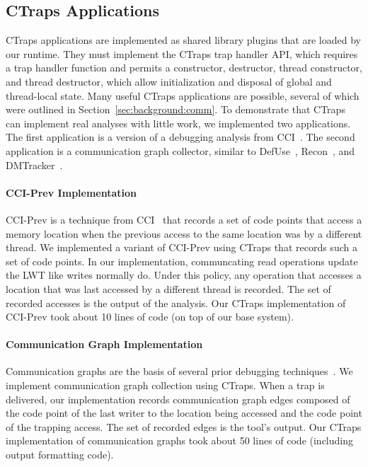 \documentclass[preprint,9pt]{sigplanconf}
\newcommand{\ctraps}{CTraps\xspace}
\begin{document}
\subsection{\ctraps Applications}
\label{sec:apps}
\ctraps applications are implemented as shared library plugins that are loaded
by our runtime.  They must implement the \ctraps trap handler API, which
requires a trap handler function and permits a constructor, destructor, thread
constructor, and thread destructor, which allow initialization and disposal of
global and thread-local state.  Many useful \ctraps applications are possible,
several of which were outlined in Section~\ref{sec:background:comm}.    To
demonstrate that \ctraps can implement real analyses with little work, we
implemented two applications. The first application is a version of a debugging
analysis from CCI~\cite{cci}.  The second application is a communication graph
collector, similar to DefUse~\cite{defuse}, Recon~\cite{recon}, and
DMTracker~\cite{dmtracker}.

\paragraph{CCI-Prev Implementation}
CCI-Prev is a technique from CCI~\cite{cci} that records a set of code points
that access a memory location when the previous access to the same location was
by a different thread.  We implemented a variant of CCI-Prev using \ctraps that
records such a set of code points.  In our implementation, communcating read
operations update the LWT like writes normally do.  Under this policy, any
operation that accesses a location that was last accessed by a different thread
is recorded.  The set of recorded accesses is the output of the analysis.  Our
\ctraps implementation of CCI-Prev took about 10 lines of code (on top of our
base system). 

\paragraph{Communication Graph Implementation}
Communication graphs are the basis of several prior debugging
techniques~\cite{recon, bugaboo, defuse}.  We implement communication graph
collection using \ctraps.  When a trap is delivered, our implementation records
communication graph edges composed of the code point of the last writer to the
location being accessed and the code point of the trapping access.  The set of
recorded edges is the tool's output.  Our \ctraps implementation of
communication graphs took about 50 lines of code (including output formatting
code). 
\end{document}
